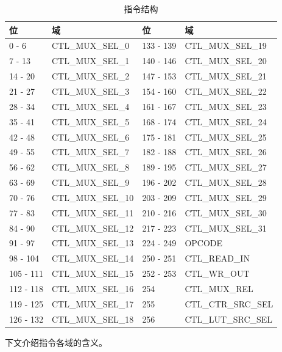 \documentclass[main\_\_CN.tex]{subfiles}
\begin{document}
\begin{table}[H]
\centering
\caption{指令结构}
\label{tab:bitscrm-instruction-struct}
\begin{tabular}{ | l | l || l| l | }
\hline\rowcolor{lightgray}
位 & 域 & 位 & 域 \\
\hline
0 - 6 & CTL\_MUX\_SEL\_0 & 133 - 139 & CTL\_MUX\_SEL\_19 \\ \hline
7 - 13 & CTL\_MUX\_SEL\_1 & 140 - 146 & CTL\_MUX\_SEL\_20 \\ \hline
14 - 20 & CTL\_MUX\_SEL\_2 & 147 - 153 & CTL\_MUX\_SEL\_21 \\ \hline
21 - 27 & CTL\_MUX\_SEL\_3 & 154 - 160 & CTL\_MUX\_SEL\_22 \\ \hline
28 - 34 & CTL\_MUX\_SEL\_4 & 161 - 167 & CTL\_MUX\_SEL\_23 \\ \hline
35 - 41 & CTL\_MUX\_SEL\_5 & 168 - 174 & CTL\_MUX\_SEL\_24 \\ \hline
42 - 48 & CTL\_MUX\_SEL\_6 & 175 - 181 & CTL\_MUX\_SEL\_25 \\ \hline
49 - 55 & CTL\_MUX\_SEL\_7 & 182 - 188 & CTL\_MUX\_SEL\_26 \\ \hline
56 - 62 & CTL\_MUX\_SEL\_8 & 189 - 195 & CTL\_MUX\_SEL\_27 \\ \hline
63 - 69 & CTL\_MUX\_SEL\_9 & 196 - 202 & CTL\_MUX\_SEL\_28 \\ \hline
70 - 76 & CTL\_MUX\_SEL\_10 & 203 - 209 & CTL\_MUX\_SEL\_29 \\ \hline
77 - 83 & CTL\_MUX\_SEL\_11 & 210 - 216 & CTL\_MUX\_SEL\_30 \\ \hline
84 - 90 & CTL\_MUX\_SEL\_12 & 217 - 223 & CTL\_MUX\_SEL\_31 \\ \hline
91 - 97 & CTL\_MUX\_SEL\_13 & 224 - 249 & OPCODE \\ \hline
98 - 104 & CTL\_MUX\_SEL\_14 & 250 - 251 & CTL\_READ\_IN \\ \hline
105 - 111 & CTL\_MUX\_SEL\_15 & 252 - 253 & CTL\_WR\_OUT \\ \hline
112 - 118 & CTL\_MUX\_SEL\_16 & 254 & CTL\_MUX\_REL \\ \hline
119 - 125 & CTL\_MUX\_SEL\_17 & 255 & CTL\_CTR\_SRC\_SEL \\ \hline
126 - 132 & CTL\_MUX\_SEL\_18 & 256 & CTL\_LUT\_SRC\_SEL \\
\hline
\end{tabular}
\end{table}


下文介绍指令各域的含义。
\end{document}
